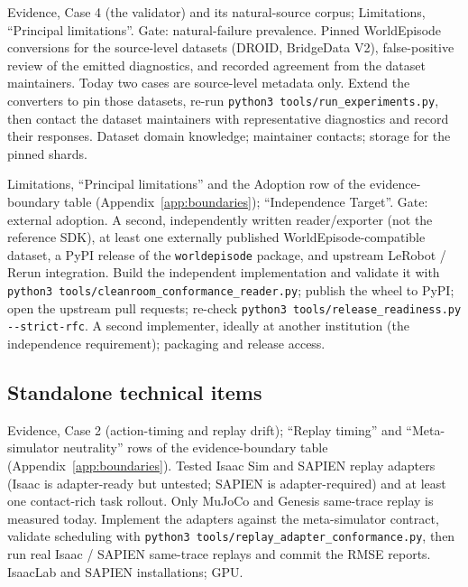 {Evidence, Case 4 (the validator) and its natural-source corpus; Limitations, ``Principal
limitations''. Gate: natural-failure prevalence.}
{Pinned WorldEpisode conversions for the source-level datasets (DROID, BridgeData V2), false-positive
review of the emitted diagnostics, and recorded agreement from the dataset maintainers. Today two
cases are source-level metadata only.}
{Extend the converters to pin those datasets, re-run \texttt{python3 tools/run\_experiments.py}, then
contact the dataset maintainers with representative diagnostics and record their responses.}
{Dataset domain knowledge; maintainer contacts; storage for the pinned shards.}

{Limitations, ``Principal limitations'' and the Adoption row of the evidence-boundary table
(Appendix~\ref{app:boundaries});  ``Independence Target''. Gate: external adoption.}
{A second, independently written reader/exporter (not the reference SDK), at least one externally
published WorldEpisode-compatible dataset, a PyPI release of the \texttt{worldepisode} package, and
upstream LeRobot / Rerun integration.}
{Build the independent implementation and validate it with
\texttt{python3 tools/cleanroom\_conformance\_reader.py}; publish the wheel to PyPI; open the upstream
pull requests; re-check \texttt{python3 tools/release\_readiness.py -{}-strict-rfc}.}
{A second implementer, ideally at another institution (the independence requirement); packaging and
release access.}

\subsection*{Standalone technical items}

{Evidence, Case 2 (action-timing and replay drift); ``Replay timing'' and ``Meta-simulator
neutrality'' rows of the evidence-boundary table (Appendix~\ref{app:boundaries}).}
{Tested Isaac Sim and SAPIEN replay adapters (Isaac is adapter-ready but untested; SAPIEN is
adapter-required) and at least one contact-rich task rollout. Only MuJoCo and Genesis same-trace
replay is measured today.}
{Implement the adapters against the meta-simulator contract, validate scheduling with
\texttt{python3 tools/replay\_adapter\_conformance.py}, then run real Isaac / SAPIEN same-trace
replays and commit the RMSE reports.}
{IsaacLab and SAPIEN installations; GPU.}

